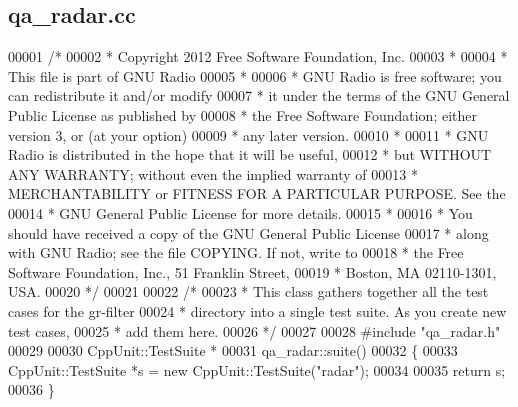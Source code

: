 \subsection{qa\+\_\+radar.\+cc}
\label{qa__radar_8cc_source}

\begin{DoxyCode}
00001 \textcolor{comment}{/*}
00002 \textcolor{comment}{ * Copyright 2012 Free Software Foundation, Inc.}
00003 \textcolor{comment}{ *}
00004 \textcolor{comment}{ * This file is part of GNU Radio}
00005 \textcolor{comment}{ *}
00006 \textcolor{comment}{ * GNU Radio is free software; you can redistribute it and/or modify}
00007 \textcolor{comment}{ * it under the terms of the GNU General Public License as published by}
00008 \textcolor{comment}{ * the Free Software Foundation; either version 3, or (at your option)}
00009 \textcolor{comment}{ * any later version.}
00010 \textcolor{comment}{ *}
00011 \textcolor{comment}{ * GNU Radio is distributed in the hope that it will be useful,}
00012 \textcolor{comment}{ * but WITHOUT ANY WARRANTY; without even the implied warranty of}
00013 \textcolor{comment}{ * MERCHANTABILITY or FITNESS FOR A PARTICULAR PURPOSE.  See the}
00014 \textcolor{comment}{ * GNU General Public License for more details.}
00015 \textcolor{comment}{ *}
00016 \textcolor{comment}{ * You should have received a copy of the GNU General Public License}
00017 \textcolor{comment}{ * along with GNU Radio; see the file COPYING.  If not, write to}
00018 \textcolor{comment}{ * the Free Software Foundation, Inc., 51 Franklin Street,}
00019 \textcolor{comment}{ * Boston, MA 02110-1301, USA.}
00020 \textcolor{comment}{ */}
00021 
00022 \textcolor{comment}{/*}
00023 \textcolor{comment}{ * This class gathers together all the test cases for the gr-filter}
00024 \textcolor{comment}{ * directory into a single test suite.  As you create new test cases,}
00025 \textcolor{comment}{ * add them here.}
00026 \textcolor{comment}{ */}
00027 
00028 \textcolor{preprocessor}{#include "qa_radar.h"}
00029 
00030 CppUnit::TestSuite *
00031 qa_radar::suite()
00032 \{
00033   CppUnit::TestSuite *s = \textcolor{keyword}{new} CppUnit::TestSuite(\textcolor{stringliteral}{"radar"});
00034 
00035   \textcolor{keywordflow}{return} s;
00036 \}
\end{DoxyCode}
